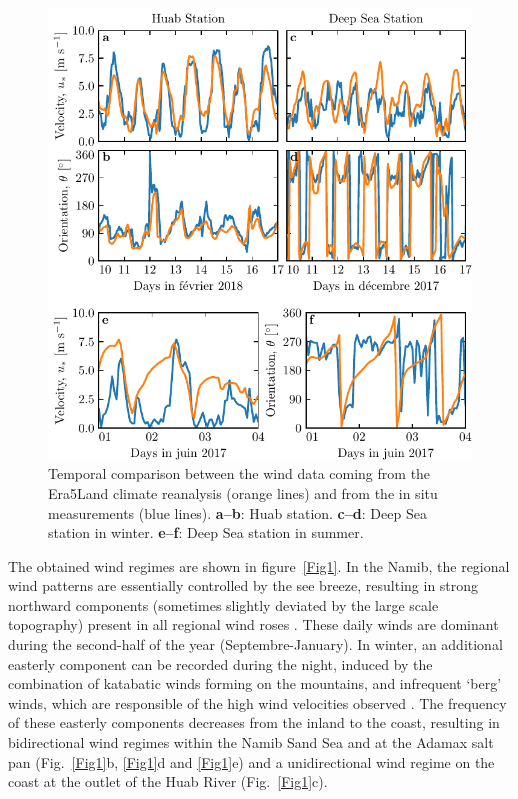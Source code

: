   \begin{figure}
    \centering
    \includegraphics[scale=1]{Figures/Figure2.pdf}
    \caption{Temporal comparison between the wind data coming from the Era5Land climate reanalysis (orange lines) and from the in situ measurements (blue lines). \textbf{a--b}: Huab station. \textbf{c--d}: Deep Sea station in winter. \textbf{e--f}: Deep Sea station in summer.}
    \label{Fig2}
  \end{figure}

  The obtained wind regimes are shown in figure~\ref{Fig1}. In the Namib, the regional wind patterns are essentially controlled by the see breeze, resulting in strong northward components (sometimes slightly deviated by the large scale topography) present in all regional wind roses \citep{lancaster1985}. These daily winds are dominant during the second-half of the year (Septembre-January). In winter, an additional easterly component can be recorded during the night, induced by the combination of katabatic winds forming on the mountains, and infrequent `berg' winds, which are responsible of the high wind velocities observed \citep{lancaster1984}. The frequency of these easterly components decreases from the inland to the coast, resulting in bidirectional wind regimes within the Namib Sand Sea and at the Adamax salt pan (Fig.~\ref{Fig1}b, \ref{Fig1}d and \ref{Fig1}e) and a unidirectional wind regime on the coast at the outlet of the Huab River (Fig.~\ref{Fig1}c).

